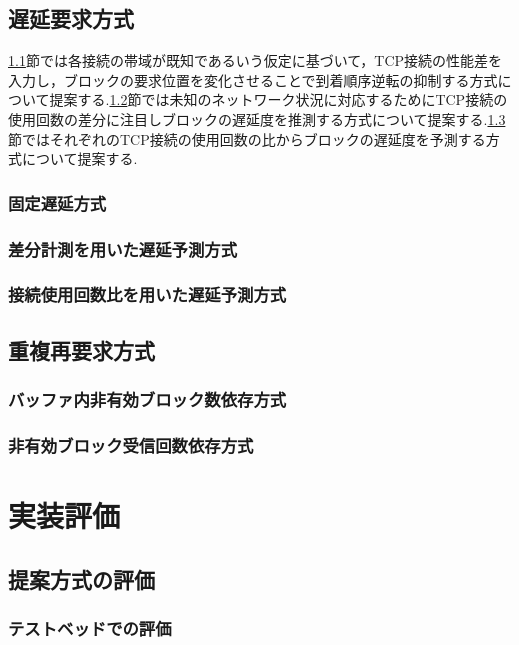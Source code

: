 \documentclass[a4j,12pt]{gradthesis_utf8}
\begin{document}
\section{遅延要求方式}
\ref{kotei}節では各接続の帯域が既知であるいう仮定に基づいて，TCP接続の性能差を入力し，ブロックの要求位置を変化させることで到着順序逆転の抑制する方式について提案する.\ref{diff}節では未知のネットワーク状況に対応するためにTCP接続の使用回数の差分に注目しブロックの遅延度を推測する方式について提案する.\ref{inv}節ではそれぞれのTCP接続の使用回数の比からブロックの遅延度を予測する方式について提案する.
\subsection{固定遅延方式}
\label{kotei}


\subsection{差分計測を用いた遅延予測方式}
\label{diff}

\subsection{接続使用回数比を用いた遅延予測方式}
\label{inv}

\section{重複再要求方式}
\subsection{バッファ内非有効ブロック数依存方式}
\subsection{非有効ブロック受信回数依存方式}

\chapter{実装評価}\label{sec:sec4}

\section{提案方式の評価}
\subsection{テストベッドでの評価}
\end{document}
